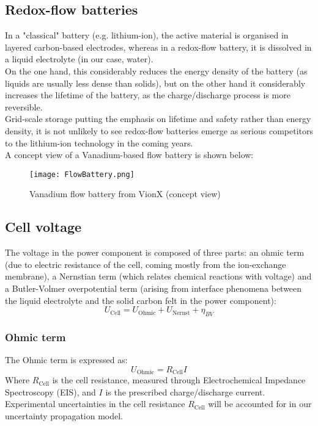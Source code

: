 \documentclass[a4paper,12pt]{article} %
\begin{document}
\subsection{Redox-flow batteries}
In a "classical" battery (e.g. lithium-ion), the active material is organised in layered carbon-based electrodes, whereas in a redox-flow battery, it is dissolved in a liquid electrolyte (in our case, water).\\
On the one hand, this considerably reduces the energy density of the battery (as liquids are usually less dense than solids), but on the other hand it considerably increases the lifetime of the battery, as the charge/discharge process is more reversible.\\
Grid-scale storage putting the emphasis on lifetime and safety rather than energy density, it is not unlikely to see redox-flow batteries emerge as serious competitors to the lithium-ion technology in the coming years.\\

A concept view of a Vanadium-based flow battery is shown below:
 \begin{figure}[H] %
    \texttt{[image: FlowBattery.png]} 
    \centering %
    \caption{Vanadium flow battery from VionX (concept view)} %
  \end{figure}

\subsection{Cell voltage}
The voltage in the power component is composed of three parts: an ohmic term (due to electric resistance of the cell, coming mostly from the ion-exchange membrane), a Nernstian term (which relates chemical reactions with voltage) and a Butler-Volmer overpotential term (arising from interface phenomena between the liquid electrolyte and the solid carbon felt in the power component):
\begin{equation}
    \boxed{U_{\text{Cell}} = U_{\text{Ohmic}} + U_{\text{Nernst}} + \eta_{BV}}
\end{equation}

\subsubsection{Ohmic term}
The Ohmic term is expressed as:
\begin{equation}
    \boxed{U_{\text{Ohmic}} = R_{\text{Cell}} I}
    \label{Ohm}
\end{equation}
Where $R_{\text{Cell}} $ is the cell resistance, measured through Electrochemical Impedance Spectroscopy (EIS), and $I$ is the prescribed charge/discharge current. Experimental uncertainties in the cell resistance $R_{\text{Cell}} $ will be accounted for in our uncertainty propagation model.
\end{document}
